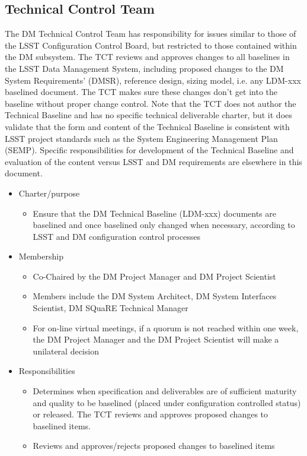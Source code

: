 \subsection{Technical Control Team}
The DM Technical Control Team has responsibility for issues similar to those of the LSST Configuration Control Board, but restricted to those contained within the DM subsystem. The TCT reviews and approves changes to all baselines in the LSST Data Management System, including proposed changes to the DM System Requirements' (DMSR), reference design, sizing model, i.e. any LDM-xxx baselined document.  The TCT makes sure these changes don't get into the baseline without proper change control.  Note that the TCT does not author the Technical Baseline and has no specific technical deliverable charter, but it does validate that the form and content of the Technical Baseline is consistent with LSST project standards such as the System Engineering Management Plan (SEMP).  Specific responsibilities for development of the Technical Baseline and evaluation of the content versus LSST and DM requirements are elsewhere in this document.
\begin{itemize}
\item Charter/purpose
	\begin{itemize}
	\item Ensure that the DM Technical Baseline (LDM-xxx) documents are baselined and once baselined only changed when necessary, according to LSST and DM configuration control processes
	\end{itemize}
\item Membership
	\begin{itemize}
	\item Co-Chaired by the DM Project Manager and DM Project Scientist
	\item Members include the DM System Architect, DM System Interfaces Scientist, DM SQuaRE Technical Manager
	\item For on-line virtual meetings, if a quorum is not reached within one week, the DM Project Manager and the DM Project Scientist will make a unilateral decision
	\end{itemize}
\item Responsibilities
	\begin{itemize}
	\item Determines when specification and deliverables are of sufficient maturity and quality to be baselined (placed under configuration controlled status) or released. The TCT reviews and approves proposed changes to baselined items.
	\item Reviews and approves/rejects proposed changes to baselined items
	\end{itemize}
\end{itemize}

